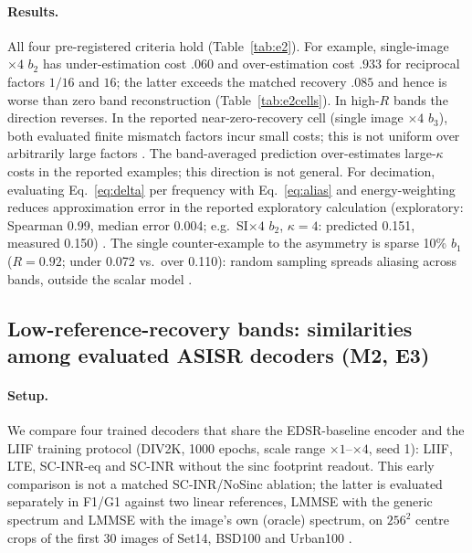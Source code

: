 \paragraph{Results.} All four pre-registered criteria hold
(Table~\ref{tab:e2}). For example, single-image $\times4$ $b_2$ has under-estimation cost $.060$ and over-estimation cost $.933$ for reciprocal factors $1/16$ and $16$; the latter exceeds the matched recovery $.085$ and hence is worse than zero band reconstruction
(Table~\ref{tab:e2cells}). In high-$R$ bands the direction reverses. In the reported near-zero-recovery cell (single image $\times4$ $b_3$), both evaluated finite mismatch factors incur small costs; this is not uniform over arbitrarily large factors .
The band-averaged prediction over-estimates large-$\kappa$ costs in the reported examples; this direction is not general. For
decimation, evaluating Eq.~\eqref{eq:delta} per frequency with
Eq.~\eqref{eq:alias} and energy-weighting reduces approximation error in the reported exploratory calculation (exploratory:
Spearman 0.99, median error 0.004; e.g.\ SI$\times4$ $b_2$, $\kappa=4$:
predicted 0.151, measured 0.150) .
The single counter-example to the asymmetry is sparse 10\% $b_1$ ($R=0.92$;
under 0.072 vs.\ over 0.110): random sampling spreads aliasing across bands,
outside the scalar model .

\subsection{Low-reference-recovery bands: similarities among evaluated ASISR decoders (M2, E3)}\label{sec:exp-c}

\paragraph{Setup.} We compare four trained decoders that share the
EDSR-baseline encoder and the LIIF training protocol (DIV2K, 1000 epochs,
scale range $\times1$--$\times4$, seed 1): LIIF, LTE, SC-INR-eq and
SC-INR without the sinc footprint readout. This early comparison is not a matched SC-INR/NoSinc ablation; the latter is evaluated separately in F1/G1
against two linear references, LMMSE with the generic spectrum and LMMSE with
the image's own (oracle) spectrum, on $256^2$ centre crops of the first 30
images of Set14, BSD100 and Urban100 .

